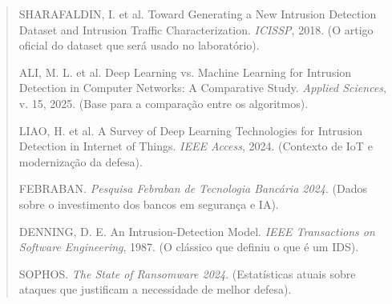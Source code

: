 \documentclass[]{article}
\begin{document}
\begin{quote}
SHARAFALDIN, I. et al. Toward Generating a New Intrusion Detection
Dataset and Intrusion Traffic Characterization. \emph{ICISSP}, 2018. (O
artigo oficial do dataset que será usado no laboratório).

ALI, M. L. et al. Deep Learning vs. Machine Learning for Intrusion
Detection in Computer Networks: A Comparative Study. \emph{Applied
Sciences}, v. 15, 2025. (Base para a comparação entre os algoritmos).

LIAO, H. et al. A Survey of Deep Learning Technologies for Intrusion
Detection in Internet of Things. \emph{IEEE Access}, 2024. (Contexto de
IoT e modernização da defesa).

FEBRABAN. \emph{Pesquisa Febraban de Tecnologia Bancária 2024}. (Dados
sobre o investimento dos bancos em segurança e IA).

DENNING, D. E. An Intrusion-Detection Model. \emph{IEEE Transactions on
Software Engineering}, 1987. (O clássico que definiu o que é um IDS).

SOPHOS. \emph{The State of Ransomware 2024}. (Estatísticas atuais sobre
ataques que justificam a necessidade de melhor defesa).
\end{quote}
\end{document}
